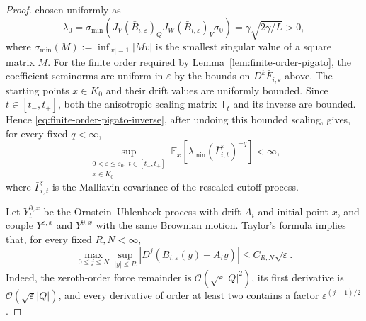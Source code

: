 \documentclass[11pt]{article}
\numberwithin{equation}{section}
\theoremstyle{plain}
\theoremstyle{definition}
\theoremstyle{remark}
\newcommand{\eps}{\varepsilon}
\newcommand{\E}{\mathbb E}
\begin{document}
\begin{proof}
chosen uniformly as
\[
\lambda_0
=\sigma_{\min}\!\left(J_V(\bar B_{i,\eps})_Q
J_W(\bar B_{i,\eps})_V\sigma_0\right)
=\gamma\sqrt{2\gamma/L}>0,
\]
where 
$\sigma_{\min}(M):=\inf_{|v|=1}|Mv|$
is the smallest singular value of a square matrix $M$.
For the finite order required by
Lemma~\ref{lem:finite-order-pigato}, the coefficient seminorms are uniform in
$\eps$ by the bounds on $D^k\bar F_{i,\eps}$ above.  The starting points
$x\in K_0$ and their drift values are uniformly bounded.  Since
$t\in[t_-,t_+]$, both the anisotropic scaling matrix $\mathsf T_t$ and its
inverse are bounded.  Hence
\eqref{eq:finite-order-pigato-inverse}, after undoing this bounded scaling,
gives, for every fixed $q<\infty$,
\begin{equation}
\label{eq:uniform-well-malliavin-inverse}
 \sup_{\substack{0<\eps\le\eps_0,\ t\in[t_-,t_+]\\x\in K_0}}
 \E_x\!\left[\lambda_{\min}(\bar\Gamma_{i,t}^\eps)^{-q}\right]<\infty,
\end{equation}
where $\bar\Gamma_{i,t}^\eps$ is the Malliavin covariance of the rescaled cutoff
process.

Let $Y_t^{0,x}$ be the Ornstein--Uhlenbeck process with drift $A_i$ and initial
point $x$, and
couple $Y^{\eps,x}$ and $Y^{0,x}$ with the same Brownian motion.  Taylor's
formula implies that, for every fixed $R,N<\infty$,
\begin{equation}
\label{eq:well-local-drift-convergence}
\max_{0\le j\le N}\sup_{|y|\le R}
\left|D^j\left(\bar B_{i,\eps}(y)-A_iy\right)\right|
\le C_{R,N}\sqrt\eps .
\end{equation}
Indeed, the zeroth-order force remainder is
$\mathcal O(\sqrt\eps|Q|^2)$, its first derivative is
$\mathcal O(\sqrt\eps|Q|)$, and every derivative of order at least two
contains a factor $\eps^{(j-1)/2}$.


\end{proof}
\end{document}
